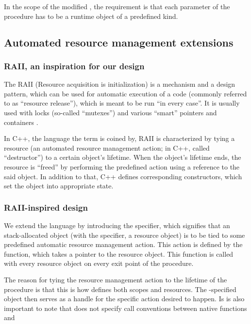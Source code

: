 In the scope of the modified \cmm, the requirement is that each parameter of the  procedure has to be a runtime object of a predefined kind.

\subsection{Automated resource management extensions}
\label{RAII}

\subsubsection{RAII, an inspiration for our design}

The RAII (Resource acquisition is initialization) is a mechanism and a design pattern, which can be used for automatic execution of a code (commonly referred to as ``resource release''), which is meant to be run ``in every case''. It is usually used with locks (so-called ``mutexes'') and various ``smart'' pointers and containers \cite{obiltschnigusing}.

In C++, the language the term is coined by, RAII is characterized by tying a resource (an automated resource management action; in C++, called ``destructor'') to a certain object's lifetime. When the object's lifetime ends, the resource is ``freed'' by performing the predefined action using a reference to the said object. In addition to that, C++ defines corresponding constructors, which set the object into appropriate state.


\subsubsection{RAII-inspired design}

We extend the language by introducing the  specifier, which signifies that an stack-allocated object (with the  specifier, a resource object) is to be tied to some predefined automatic resource management action. This action is defined by the  function, which takes a pointer to the resource object. This function is called with every resource object on every exit point of the procedure.

The reason for tying the resource management action to the lifetime of the procedure is that this is how \cmm defines both scopes and resources. The -specified object then serves as a handle for the specific action desired to happen. Is is also important to note that \cmm does not specify call conventions between native \cmm functions and

